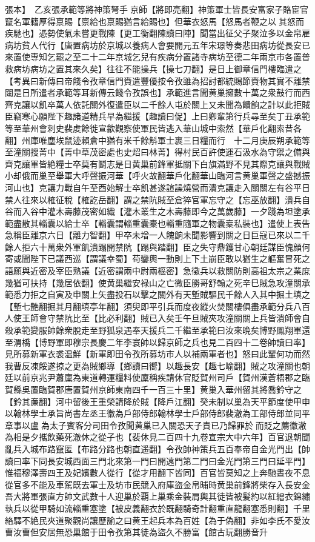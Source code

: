 張本】　乙亥張承範等將神策弩手京師【將即亮翻】神策軍士皆長安富家子賂宦官竄名軍籍厚得禀賜【禀給也禀賜猶言給賜也】但華衣怒馬【怒馬者鞭之以其怒而疾馳也】憑勢使氣未嘗更戰陳【更工衡翻陳讀曰陣】聞當出征父子聚泣多以金帛雇病坊貧人代行【唐置病坊於京城以養病人會要開元五年宋璟等奏悲田病坊從長安已來置使專知乞罷之至二十二年京城乞兒有疾病分置諸寺病坊至德二年兩京市各置普救病坊病坊之置其來久矣】往往不能操兵【操七刀翻】是日上御章信門樓臨遣之　【考異曰新傳曰帝餞令孜章信門賚遣豐優按令孜雖為招討都統賜節賚物其實不離禁闥是日所遣者承範等耳新傳云餞令孜誤也】承範進言聞黄巢擁數十萬之衆鼓行而西齊克讓以飢卒萬人依託關外復遣臣以二千餘人屯於關上又未聞為饋餉之計以此拒賊臣竊寒心願陛下趣諸道精兵早為繼援【趣讀曰促】上曰卿輩第行兵尋至矣丁丑承範等至華州會刺史裴䖍餘徙宣歙觀察使軍民皆逃入華山城中索然【華戶化翻索昔各翻】州庫唯塵埃鼠迹賴倉中猶有米千餘斛軍士裹三日糧而行　十二月庚辰朔承範等至潼關搜菁中【菁中草茂密處也史炤曰林菁】得村民百許使運石汲水為守禦之備與齊克讓軍皆絶糧士卒莫有鬭志是日黄巢前鋒軍抵關下白旗滿野不見其際克讓與戰賊小却俄而巢至舉軍大呼聲振河華【呼火故翻華戶化翻華山臨河言黄巢軍聲之盛撼振河山也】克讓力戰自午至酉始解士卒飢甚遂諠譟燒營而潰克讓走入關關左有谷平日禁人往來以榷征稅【榷訖岳翻】謂之禁阬賊至倉猝官軍忘守之【忘巫放翻】潰兵自谷而入谷中灌木壽藤茂密如織【灌木叢生之木壽藤即今之萬歲藤】一夕踐為坦塗承範盡散其輜囊以給士卒【輜囊謂輜重囊橐也輜重隨軍之物囊槖私裝也】遣使上表告急稱臣離京六日【離力智翻】甲卒未增一人餽餉未聞影響到關之日巨寇已來以二千餘人拒六十萬衆外軍飢潰蹋開禁阬【蹋與踏翻】臣之失守鼎鑊甘心朝廷謀臣愧顔何寄或聞陛下已議西巡【謂議幸蜀】苟鑾輿一動則上下土崩臣敢以猶生之軀奮冒死之語願與近密及宰臣熟議【近密謂兩中尉兩樞密】急徵兵以救關防則高祖太宗之業庶幾猶可扶持【幾居依翻】使黄巢繼安禄山之亡微臣勝哥舒翰之死辛巳賊急攻潼關承範悉力拒之自寅及申關上矢盡投石以擊之關外有天塹賊驅民千餘人入其中掘土填之【塹七艶翻掘其月翻填亭年翻】須臾即平引兵而度夜縱火焚關樓俱盡承範分兵八百人使王師會守禁阬比至【比必利翻】賊已入矣壬午旦賊夾攻潼關關上兵皆潰師會自殺承範變服帥餘衆脫走至野狐泉遇奉天援兵二千繼至承範曰汝來晩矣博野鳳翔軍還至渭橋【博野軍即穆宗長慶二年李寰帥以歸京師之兵也見二百四十二卷帥讀曰率】見所募新軍衣裘温鮮【新軍即田令孜所募坊市人以補兩軍者也】怒曰此輩何功而然我曹反凍餒遂掠之更為賊鄉導【鄉讀曰嚮】以趣長安【趣七喻翻】賊之攻潼關也朝廷以前京兆尹蕭廩為東道轉運糧料使廩稱疾請休官貶賀州司戶【賀州漢蒼梧郡之臨賀縣吳置臨賀郡唐置賀州京師東南四千一百三十里】黄巢入華州留其將喬鈐守之【鈐其亷翻】河中留後王重榮請降於賊【降戶江翻】癸未制以巢為天平節度使甲申以翰林學士承旨尚書左丞王徽為戶部侍郎翰林學士戶部侍郎裴澈為工部侍郎並同平章事以盧為太子賓客分司田令孜聞黄巢已入關恐天子責已乃歸罪於而貶之薦徽澈為相是夕攜飲藥死澈休之從子也【裴休見二百四十九卷宣宗大中六年】百官退朝聞亂兵入城布路竄匿【布路分路也朝直遥翻】令孜帥神策兵五百奉帝自金光門出【帥讀曰率下同長安城西面三門北來第一門曰開遠門第二門曰金光門第三門曰延平門】惟福穆澤壽四王及妃嬪數人從行【從才用翻下皆同】百官皆莫知之上奔馳晝夜不息從官多不能及車駕既去軍士及坊市民競入府庫盜金帛晡時黄巢前鋒將柴存入長安金吾大將軍張直方帥文武數十人迎巢於覇上巢乘金裝肩輿其徒皆被髪約以紅繒衣錦繡執兵以從甲騎如流輜重塞塗【被皮義翻衣於既翻騎奇計翻重直龍翻塞悉則翻】千里絡驛不絶民夾道聚觀尚讓歷諭之曰黄王起兵本為百姓【為于偽翻】非如李氏不愛汝曹汝曹但安居無恐巢館于田令孜第其徒為盜久不勝富【館古玩翻勝音升